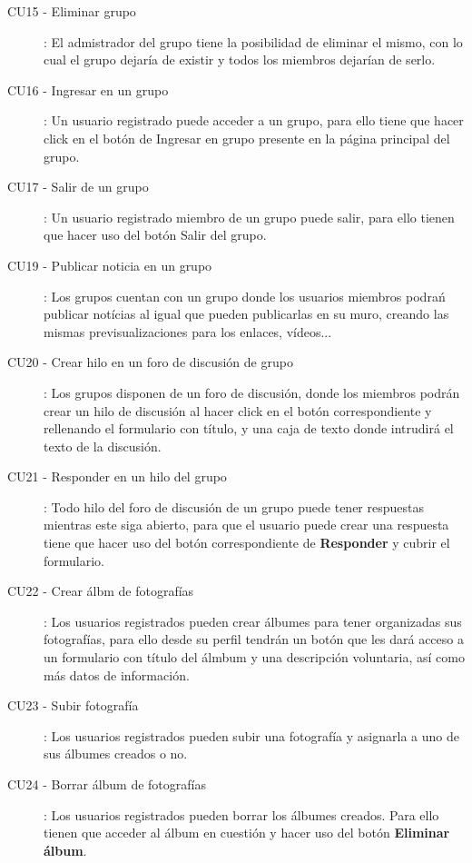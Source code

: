 \documentclass[12pt, a4paper, titlepage]{article}
\begin{document}
\begin{description}
	\item [CU15 - Eliminar grupo]: El admistrador del grupo tiene la posibilidad de eliminar el mismo, con lo cual el grupo dejaría de existir y todos los miembros dejarían de serlo.
	
	\item [CU16 - Ingresar en un grupo]: Un usuario registrado puede acceder a un grupo, para ello tiene que hacer click en el botón de Ingresar en grupo presente en la página principal del grupo.
	
	\item [CU17 - Salir de un grupo]: Un usuario registrado miembro de un grupo puede salir, para ello tienen que hacer uso del botón Salir del grupo.
	
	\item [CU19 - Publicar noticia en un grupo]: Los grupos cuentan con un grupo donde los usuarios miembros podrań publicar notícias al igual que pueden publicarlas en su muro, creando las mismas previsualizaciones para los enlaces, vídeos...
	
	\item [CU20 - Crear hilo en un foro de discusión de grupo]: Los grupos disponen de un foro de discusión, donde los miembros podrán crear un hilo de discusión al hacer click en el botón correspondiente y rellenando el formulario con título, y una caja de texto donde intrudirá el texto de la discusión.
	
	\item [CU21 - Responder en un hilo del grupo]: Todo hilo del foro de discusión de un grupo puede tener respuestas mientras este siga abierto, para que el usuario puede crear una respuesta tiene que hacer uso del botón correspondiente de \textbf{Responder} y cubrir el formulario.
	
	\item [CU22 - Crear álbm de fotografías]: Los usuarios registrados pueden crear álbumes para tener organizadas sus fotografías, para ello desde su perfil tendrán un botón que les dará acceso a un formulario con título del álmbum y una descripción voluntaria, así como más datos de información.
	
	\item [CU23 - Subir fotografía]:  Los usuarios registrados pueden subir una fotografía y asignarla a uno de sus álbumes creados o no. 
	
	\item [CU24 - Borrar álbum de fotografías]: Los usuarios registrados pueden borrar los álbumes creados. Para ello tienen que acceder al álbum en cuestión y hacer uso del botón \textbf{Eliminar álbum}.
	

\end{description}
\end{document}

